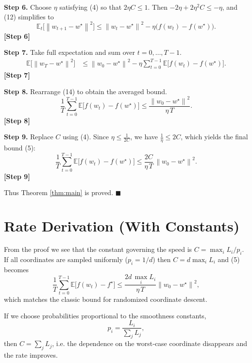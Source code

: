 \documentclass{article}
\newcommand{\E}{\mathbb{E}}
\newcommand{\norm}[1]{\left\|#1\right\|}
\begin{document}
\noindent\textbf{Step 6.}  Choose $\eta$ satisfying (4) so that $2\eta C\le 1$.
Then $-2\eta+2\eta^{2}C\le -\eta$, and (12) simplifies to
\[
\E_t\!\bigl[\norm{w_{t+1}-w^\star}^{2}\bigr]
\le \norm{w_t-w^\star}^{2}
-\eta\bigl(f(w_t)-f(w^\star)\bigr).
\tag{13}
\]
\textbf{[Step 6]}

\noindent\textbf{Step 7.}  Take full expectation and sum over $t=0,\dots,T-1$.
\[
\begin{aligned}
\E\!\bigl[\norm{w_{T}-w^\star}^{2}\bigr]
&\le \norm{w_0-w^\star}^{2}
-\eta\sum_{t=0}^{T-1}\E\!\bigl[f(w_t)-f(w^\star)\bigr].
\end{aligned}
\tag{14}
\]
\textbf{[Step 7]}

\noindent\textbf{Step 8.}  Rearrange (14) to obtain the averaged bound.
\[
\frac{1}{T}\sum_{t=0}^{T-1}\E\!\bigl[f(w_t)-f(w^\star)\bigr]
\le \frac{\norm{w_0-w^\star}^{2}}{\eta\,T}.
\tag{15}
\]
\textbf{[Step 8]}

\noindent\textbf{Step 9.}  Replace $C$ using (4). Since $\eta\le \frac{1}{2C}$, we have $\frac{1}{\eta}\le 2C$, which yields the final bound (5):
\[
\frac{1}{T}\sum_{t=0}^{T-1}\E\!\bigl[f(w_t)-f(w^\star)\bigr]
\le \frac{2C}{\eta\,T}\,\norm{w_0-w^\star}^{2}.
\]
\textbf{[Step 9]}

Thus Theorem \ref{thm:main} is proved. \hfill $\blacksquare$

\section*{Rate Derivation (With Constants)}
From the proof we see that the constant governing the speed is $C=\max_i L_i/p_i$.  
If all coordinates are sampled uniformly ($p_i=1/d$) then $C=d\max_i L_i$ and (5) becomes
\[
\frac{1}{T}\sum_{t=0}^{T-1}\E\!\bigl[f(w_t)-f^\star\bigr]
\le \frac{2d\,\max_i L_i}{\eta\,T}\norm{w_0-w^\star}^{2},
\]
which matches the classic bound for randomized coordinate descent.

If we choose probabilities proportional to the smoothness constants,
\[
p_i=\frac{L_i}{\sum_{j}L_j},
\]
then $C=\sum_{j}L_j$, i.e. the dependence on the worst‑case coordinate disappears and the rate improves.

\end{document}
